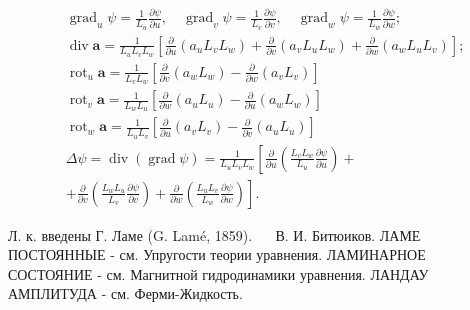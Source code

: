 \documentclass[10pt]{article}
\begin{document}
\[

\begin{aligned}

& \operatorname{grad}_{u} \psi=\frac{1}{L_{u}} \frac{\partial \psi}{\partial u}, \quad \operatorname{grad}_{v} \psi=\frac{1}{L_{v}} \frac{\partial \psi}{\partial v}, \quad \operatorname{grad}_{w} \psi=\frac{1}{L_{w}} \frac{\partial \psi}{\partial w} ; \\

& \operatorname{div} \boldsymbol{a}=\frac{1}{L_{u} L_{v} L_{w}}\left[\frac{\partial}{\partial u}\left(a_{u} L_{v} L_{w}\right)+\frac{\partial}{\partial v}\left(a_{v} L_{u} L_{w}\right)+\frac{\partial}{\partial w}\left(a_{w} L_{u} L_{v}\right)\right] ; \\

& \operatorname{rot}_{u} \boldsymbol{a}=\frac{1}{L_{v} L_{w}}\left[\frac{\partial}{\partial v}\left(a_{w} L_{w}\right)-\frac{\partial}{\partial w}\left(a_{v} L_{v}\right)\right] \\

& \operatorname{rot}_{v} \boldsymbol{a}=\frac{1}{L_{w} L_{u}}\left[\frac{\partial}{\partial w}\left(a_{u} L_{u}\right)-\frac{\partial}{\partial u}\left(a_{w} L_{w}\right)\right] \\

& \operatorname{rot}_{w} \boldsymbol{a}=\frac{1}{L_{u} L_{v}}\left[\frac{\partial}{\partial u}\left(a_{v} L_{v}\right)-\frac{\partial}{\partial v}\left(a_{u} L_{u}\right)\right] \\

& \Delta \psi=\operatorname{div}(\operatorname{grad} \psi)=\frac{1}{L_{u} L_{v} L_{w}}\left[\frac{\partial}{\partial u}\left(\frac{L_{v} L_{w}}{L_{u}} \frac{\partial \psi}{\partial u}\right)+\right. \\

& \left.+\frac{\partial}{\partial v}\left(\frac{L_{w} L_{u}}{L_{v}} \frac{\partial \psi}{\partial v}\right)+\frac{\partial}{\partial w}\left(\frac{L_{u} L_{v}}{L_{w}} \frac{\partial \psi}{\partial w}\right)\right] .

\end{aligned}

\]



Л. к. введены Г. Ламе (G. Lamé, 1859). $\quad$ В. И. Битюиков. ЛАМЕ ПОСТОЯННЫЕ - см. Упругости теории уравнения. ЛАМИНАРНОЕ СОСТОЯНИЕ - см. Магнитной гидродинамики уравнения. ЛАНДАУ АМПЛИТУДА - см. Ферми-Жидкость.
\end{document}

